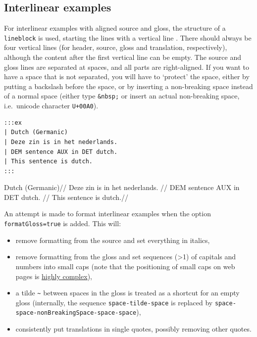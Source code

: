 \documentclass[
]{article}
\providecommand{\tightlist}{%
  \setlength{\itemsep}{0pt}\setlength{\parskip}{0pt}}
\begin{document}
\hypertarget{interlinear-examples}{%
\subsection{Interlinear examples}\label{interlinear-examples}}

For interlinear examples with aligned source and gloss, the structure of
a \texttt{lineblock} is used, starting the lines with a vertical line
\texttt{\textbar{}}. There should always be four vertical lines (for
header, source, gloss and translation, respectively), although the
content after the first vertical line can be empty. The source and gloss
lines are separated at spaces, and all parts are right-aligned. If you
want to have a space that is not separated, you will have to `protect'
the space, either by putting a backslash before the space, or by
inserting a non-breaking space instead of a normal space (either type
\texttt{\&nbsp;} or insert an actual non-breaking space, i.e.~unicode
character \texttt{U+00A0}).

\begin{verbatim}
:::ex
| Dutch (Germanic)
| Deze zin is in het nederlands.
| DEM sentence AUX in DET dutch.
| This sentence is dutch.
:::
\end{verbatim}

\begin{samepage}
  \begingl
  \glpreamble Dutch (Germanic)//
  \gla Deze zin is in het nederlands. //
  \glb DEM sentence AUX in DET dutch. //
  \glft This sentence is dutch.//
  \endgl
\xe
\end{samepage}

An attempt is made to format interlinear examples when the option
\texttt{formatGloss=true} is added. This will:

\begin{itemize}
\tightlist
\item
  remove formatting from the source and set everything in italics,
\item
  remove formatting from the gloss and set sequences (\textgreater1) of
  capitals and numbers into small caps (note that the positioning of
  small caps on web pages is
  \href{https://iamvdo.me/en/blog/css-font-metrics-line-height-and-vertical-align}{highly
  complex}),
\item
  a tilde \texttt{\textasciitilde{}} between spaces in the gloss is
  treated as a shortcut for an empty gloss (internally, the sequence
  \texttt{space-tilde-space} is replaced by
  \texttt{space-space-nonBreakingSpace-space-space}),
\item
  consistently put translations in single quotes, possibly removing
  other quotes.
\end{itemize}
\end{document}
